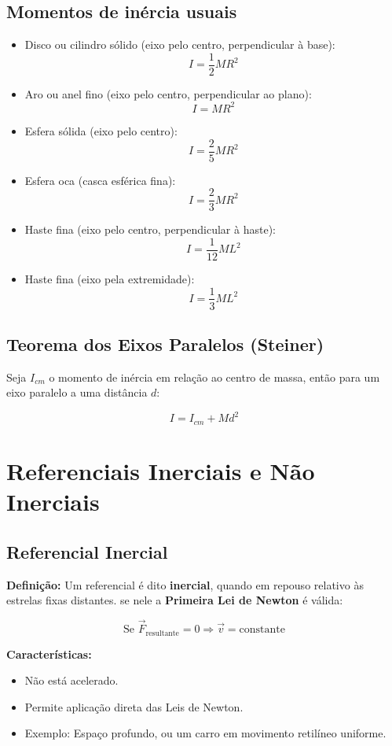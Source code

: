\documentclass[a4paper,12pt]{article}
\begin{document}
\begin{multicols}{2}
\subsection{Momentos de inércia usuais}

\begin{itemize}
    \item Disco ou cilindro sólido (eixo pelo centro, perpendicular à base):
    \[
    I = \frac{1}{2} M R^2
    \]
    \item Aro ou anel fino (eixo pelo centro, perpendicular ao plano):
    \[
    I = M R^2
    \]
    \item Esfera sólida (eixo pelo centro):
    \[
    I = \frac{2}{5} M R^2
    \]
    \item Esfera oca (casca esférica fina):
    \[
    I = \frac{2}{3} M R^2
    \]
    \item Haste fina (eixo pelo centro, perpendicular à haste):
    \[
    I = \frac{1}{12} M L^2
    \]
    \item Haste fina (eixo pela extremidade):
    \[
    I = \frac{1}{3} M L^2
    \]
\end{itemize}

\subsection{Teorema dos Eixos Paralelos (Steiner)}
Seja $I_{cm}$ o momento de inércia em relação ao centro de massa, então para um eixo paralelo a uma distância $d$:

\[
I = I_{cm} + M d^2
\]

\section{Referenciais Inerciais e Não Inerciais}

\subsection*{Referencial Inercial}

\textbf{Definição:} Um referencial é dito \textbf{inercial}, quando em repouso relativo às estrelas fixas distantes. se nele a \textbf{Primeira Lei de Newton} é válida:

\[
\text{Se } \vec{F}_{\text{resultante}} = 0 \Rightarrow \vec{v} = \text{constante}
\]

\textbf{Características:}
\begin{itemize}
  \item Não está acelerado.
  \item Permite aplicação direta das Leis de Newton.
  \item Exemplo: Espaço profundo, ou um carro em movimento retilíneo uniforme.
\end{itemize}


\end{multicols}
\end{document}
